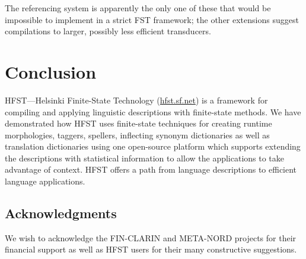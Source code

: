 \documentclass{llncs}
\begin{document}
The referencing system is apparently the only one of these that would be
impossible to implement in a strict FST framework; the other extensions suggest
compilations to larger, possibly less efficient transducers.






\section{Conclusion}
HFST---Helsinki Finite-State Technology (\url{hfst.sf.net})
is a framework for compiling and applying linguistic descriptions
with finite-state methods. We have demonstrated how HFST uses finite-state techniques 
for creating runtime morphologies, taggers, spellers, inflecting synonym dictionaries as well as 
translation dictionaries using one open-source platform which supports extending  
the descriptions with statistical information to allow the applications 
to take advantage of context. HFST offers a path from language descriptions 
to efficient language applications.

\subsection*{Acknowledgments}
We wish to acknowledge the FIN-CLARIN and META-NORD projects for their financial support 
as well as HFST users for their many constructive suggestions. 




\end{document}
